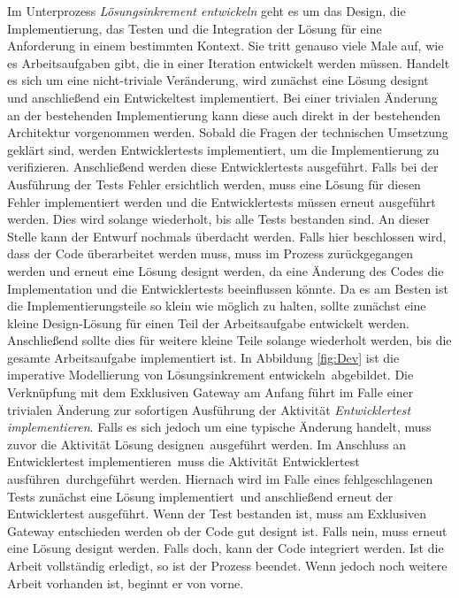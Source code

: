 Im Unterprozess \textit{Lösungsinkrement entwickeln} geht es um das Design, die Implementierung, das Testen und die Integration der Lösung für eine Anforderung in einem bestimmten Kontext. Sie tritt genauso viele Male auf, wie es Arbeitsaufgaben gibt, die in einer Iteration entwickelt werden müssen.
 Handelt es sich um eine nicht-triviale Veränderung, wird zunächst eine Lösung designt und anschließend ein Entwickeltest implementiert. Bei einer trivialen Änderung an der bestehenden Implementierung kann diese auch direkt in der bestehenden Architektur vorgenommen werden. \newline
 Sobald die Fragen der technischen Umsetzung geklärt sind, werden Entwicklertests implementiert, um die Implementierung zu verifizieren. Anschließend werden diese Entwicklertests ausgeführt.\newline
 Falls bei der Ausführung der Tests Fehler ersichtlich werden, muss eine Lösung für diesen Fehler implementiert werden und die Entwicklertests müssen erneut ausgeführt werden. Dies wird solange wiederholt, bis alle Tests bestanden sind.\newline
An dieser Stelle kann der Entwurf nochmals überdacht werden. Falls hier beschlossen wird, dass der Code überarbeitet werden muss, muss im Prozess zurückgegangen werden und erneut eine Lösung designt werden, da eine Änderung des Codes die Implementation und die Entwicklertests beeinflussen könnte.\newline
 Da es am Besten ist die Implementierungsteile so klein wie möglich zu halten, sollte zunächst eine kleine Design-Lösung für einen Teil der Arbeitsaufgabe entwickelt werden. Anschließend sollte dies für weitere kleine Teile solange wiederholt werden, bis die gesamte Arbeitsaufgabe implementiert ist. \newline
 In Abbildung \ref{fig:Dev} ist die imperative Modellierung von \grqq Lösungsinkrement entwickeln\grqq \ abgebildet.\newline
 Die Verknüpfung mit dem Exklusiven Gateway am Anfang führt im Falle einer trivialen Änderung zur sofortigen Ausführung der Aktivität \textit{Entwicklertest implementieren}. Falls es sich jedoch um eine typische Änderung handelt, muss zuvor die Aktivität \grqq Lösung designen\grqq \ ausgeführt werden. Im Anschluss an \grqq Entwicklertest implementieren\grqq \ muss die Aktivität \grqq Entwicklertest ausführen\grqq \ durchgeführt werden.\newline
 Hiernach wird im Falle eines fehlgeschlagenen Tests zunächst eine \grqq Lösung implementiert\grqq \ und anschließend erneut der \grqq Entwicklertest ausgeführt\grqq. \newline
 Wenn der Test bestanden ist, muss am Exklusiven Gateway entschieden werden ob der Code gut designt ist. Falls nein, muss erneut eine Lösung designt werden. Falls doch, kann der Code integriert werden. Ist die Arbeit vollständig erledigt, so ist der Prozess beendet. Wenn jedoch noch weitere Arbeit vorhanden ist, beginnt er von vorne.
 
